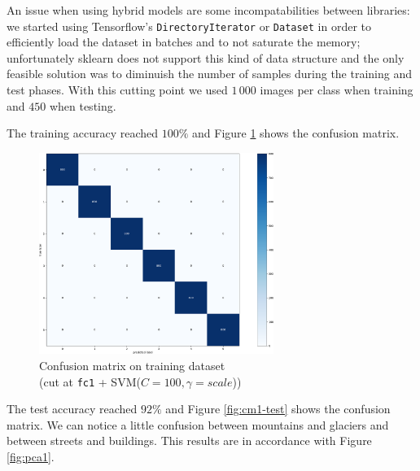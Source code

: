 \documentclass[compsoc]{IEEEtran}
\begin{document}
An issue when using hybrid models are some incompatabilities between libraries: we started using Tensorflow's \texttt{DirectoryIterator} or \texttt{Dataset} in order to efficiently load the dataset in batches and to not saturate the memory; unfortunately sklearn does not support this kind of data structure and the only feasible solution was to diminuish the number of samples during the training and test phases. With this cutting point we used $1\,000$ images per class when training and $450$ when testing. \par
The training accuracy reached $100\%$ and Figure \ref{fig:cm1-train} shows the confusion matrix. 


\begin{figure}[ht!]
\centering                                                                        
\includegraphics[width=3in]{../images/cm1-train.png}
\captionsetup{justification=centering}                                                                                         
\caption{Confusion matrix on training dataset \\ (cut at \texttt{fc1} + SVM($C=100, \gamma=scale$))}
\label{fig:cm1-train}                                                                                                                               
\end{figure}

The test accuracy reached $92\%$ and Figure \ref{fig:cm1-test} shows the confusion matrix. We can notice a little confusion between mountains and glaciers and between streets and buildings. This results are in accordance with Figure \ref{fig:pca1}.
\end{document}
